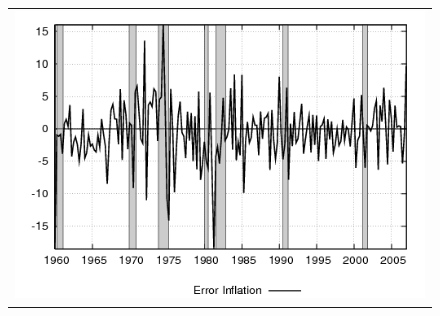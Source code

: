 \begin{figure}[ht]
\begin{center}
\begin{tabular}{c}
\includegraphics[scale=0.5]{results_cg_wlsinit/inflation_err.png} 
\end{tabular}
\end{center}
\end{figure}

